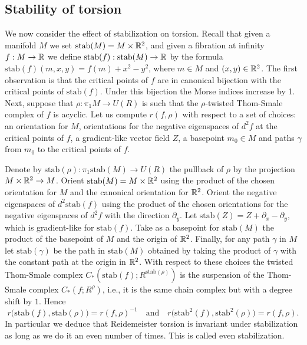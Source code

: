 \documentclass[11pt]{article}
\newcommand{\ie}{i.e.,\xspace}
\numberwithin{equation}{section}\providecommand{\dpl}{\displaystyle}
\newcommand{\stab}{\mathrm{stab}}
\theoremstyle{plain}
\theoremstyle{definition}
\begin{document}
\subsection{Stability of torsion}\label{Section: stability of torsion}
We now consider the effect of stabilization on torsion. Recall that given a manifold $M$ we set $\stab (M)=M \times \bR^2$, and given a fibra\-tion at infinity $f: M \to \mathbb{R}$ we define $\stab (f): \stab (M) \to \bR$ by the formula $\stab (f)(m,x,y)=f(m) + x^2 - y^2$, where $m\in M$ and $(x,y) \in \mathbb{R}^2$. The first obser\-vation is that the critical points of $f$ are in canonical bijection with the critical points of $\stab (f)$. Under this bijection the Morse indices increase by 1. Next, suppose that $\rho: \pi_1M \to U(R)$ is such that the $\rho$-twisted Thom-Smale complex of $f$ is acyclic. Let us compute $r(f,\rho)$ with respect to a set of choices: an orientation for $M$, orientations for the negative eigenspaces of $d^2f$ at the critical points of $f$, a gradient-like vector field $Z$, a basepoint $m_0\in M$ and paths $\gamma$ from $m_0$ to the critical points of $f$.

Denote by $\stab (\rho) : \pi_1 \stab (M) \to U(R)$ the pullback of $\rho$ by the projection \hbox{$M \times \mathbb{R}^2 \to M$}. Orient $\stab (M)=M \times \bR^2$ using the product of the chosen orientation for $M$ and the canonical orientation for $\mathbb{R}^2$. Orient the negative eigenspaces of $d^2 \stab (f)$ using the product of the chosen orientations for the negative eigenspaces of $d^2f$ with the direction $\partial_y$. Let $\stab (Z) = Z + \partial_x - \partial_y$, which is gradient-like for $\stab (f)$. Take as a basepoint for $\stab (M)$ the product of the basepoint of $M$ and the origin of $\mathbb{R}^2$. Finally, for any path $\gamma$ in $M$ let $\stab (\gamma)$ be the path in $\stab (M)$ obtained by taking the product of $\gamma$ with the constant path at the origin in $\mathbb{R}^2$. With respect to these choices the twisted Thom-Smale complex $C_*(\stab (f); R^{\stab (\rho)} )$ is the suspension of the Thom-Smale complex $C_*(f; R^\rho)$, \ie it is the same chain complex but with a degree shift by $1$. Hence
\[ r\big( \stab (f), \stab (\rho)\big) = r(f, \rho)^{-1} \quad \text{and} \quad r\big( \stab ^2(f), \stab ^2(\rho)\big) = r(f, \rho).\]
In particular we deduce that Reidemeister torsion is invariant under stabilization as long as we do it an even number of times. This is called even stabilization.
\end{document}
